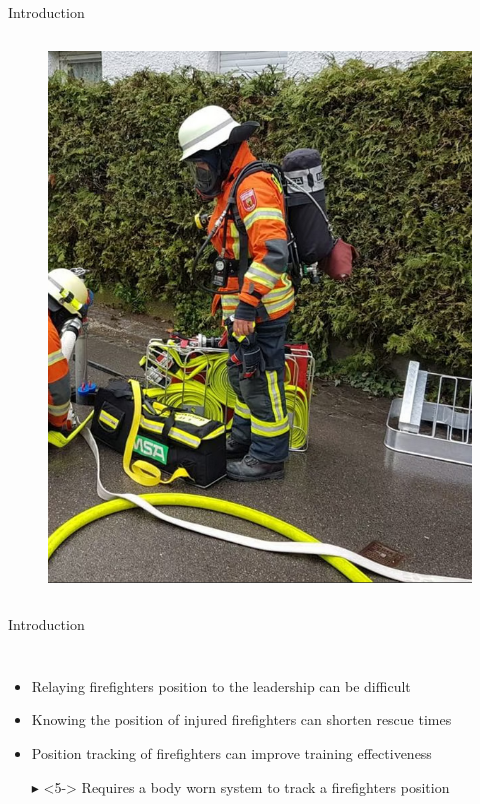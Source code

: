 \documentclass[aspectratio=169,handout]{beamer}
\begin{document}
{\begin{frame}{Introduction}
\begin{columns}
			\begin{figure}
				\centering
				\includegraphics[height=0.7\textheight]{firefighter.png}
			\end{figure}
			
		\end{columns}
		
		
	\end{frame}
	
	\begin{frame}{Introduction}
			\begin{columns}
				\begin{itemize}
					\item<2-> Relaying firefighters position to the leadership can be difficult
					\item<3-> Knowing the position of injured firefighters can shorten rescue times
					\item<4-> Position tracking of firefighters can improve training effectiveness
					\item[$\blacktriangleright$]<5-> Requires a body worn system to track a firefighters position
				\end{itemize}
		

\end{columns}
\end{frame}}
\end{document}

